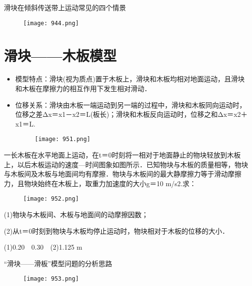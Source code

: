 \documentclass[cn,11pt]{elegantbook}
\begin{document}
\begin{note}
   滑块在倾斜传送带上运动常见的四个情景
   
   \begin{figure}[htbp]
      \centering
      \texttt{[image: 944.png]}
   \end{figure}
\end{note}




\section{滑块——木板模型}
\begin{itemize}
   \item 模型特点：滑块(视为质点)置于木板上，滑块和木板均相对地面运动，且滑块和木板在摩擦力的相互作用下发生相对滑动．
   \item 位移关系：滑块由木板一端运动到另一端的过程中，滑块和木板同向运动时，位移之差Δx＝x1－x2＝L(板长)；滑块和木板反向运动时，位移之和Δx＝x2＋x1＝L.
   \begin{figure}[htbp]
      \centering
      \texttt{[image: 951.png]}
   \end{figure}

\end{itemize}

\begin{example}
   一长木板在水平地面上运动，在t＝0时刻将一相对于地面静止的物块轻放到木板上，以后木板运动的速度—时间图象如图所示．已知物块与木板的质量相等，物块与木板间及木板与地面间均有摩擦．物块与木板间的最大静摩擦力等于滑动摩擦力，且物块始终在木板上，取重力加速度的大小g＝10 m/s2.求：

   \begin{figure}[htbp]
      \centering
      \texttt{[image: 952.png]}
   \end{figure}

   (1)物块与木板间、木板与地面间的动摩擦因数；

   (2)从t＝0时刻到物块与木板均停止运动时，物块相对于木板的位移的大小．

   \begin{solution}
   (1)0.20　0.30　(2)1.125 m
   \end{solution}
\end{example}

\begin{note}
   “滑块——滑板”模型问题的分析思路
   \begin{figure}[htbp]
      \centering
      \texttt{[image: 953.png]}
   \end{figure}
\end{note}
\end{document}
